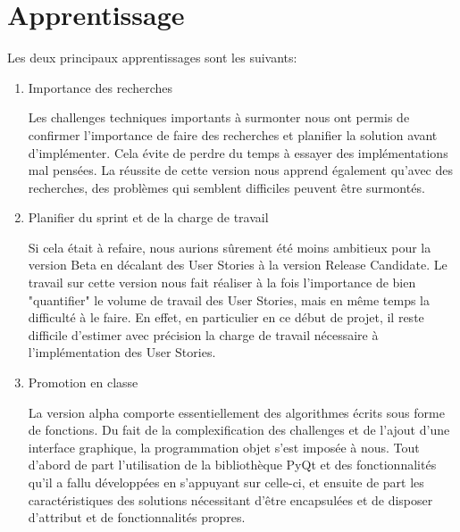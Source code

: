 \section{Apprentissage}

Les deux principaux apprentissages sont les suivants:

\begin{enumerate}
    \item Importance des recherches
    
    Les challenges techniques importants à surmonter nous ont permis de confirmer l’importance de faire des recherches et 
    planifier la solution avant d’implémenter. Cela évite de perdre du temps à essayer des implémentations mal pensées. 
    La réussite de cette version nous apprend également qu’avec des recherches, des problèmes qui semblent difficiles 
    peuvent être surmontés.
    \item Planifier du sprint et de la charge de travail
    
    Si cela était à refaire, nous aurions sûrement été moins ambitieux pour la version Beta en décalant des User Stories 
    à la version Release Candidate. Le travail sur cette version nous fait réaliser à la fois l'importance de bien "quantifier" 
    le volume de travail des User Stories, mais en même temps la difficulté à le faire. En effet, en particulier en ce début de projet, 
    il reste difficile d’estimer avec précision la charge de travail nécessaire à l'implémentation des User Stories.
    
    \item Promotion en classe
    
    La version alpha comporte essentiellement des algorithmes écrits sous forme de fonctions. Du fait de la complexification 
    des challenges et de l’ajout d’une interface graphique, la programmation objet s’est imposée à nous. Tout d’abord de part 
    l’utilisation de la bibliothèque PyQt et des fonctionnalités qu’il a fallu développées en s’appuyant sur celle-ci, et ensuite 
    de part les caractéristiques des solutions nécessitant d’être encapsulées et de disposer d’attribut et de fonctionnalités propres. 

\end{enumerate}

